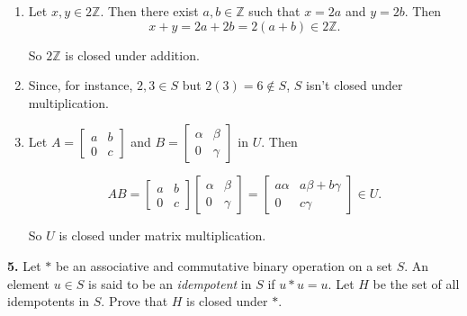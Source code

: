 \documentclass[10pt,]{book}
\theoremstyle{plain}
\theoremstyle{definition}
\theoremstyle{definition}
\theoremstyle{definition}
\theoremstyle{definition}
\numberwithin{equation}{section}
\def\Z{\mathbb{Z}}
\newcommand{\amp}{ & }
\begin{document}
\par\smallskip
\leavevmode%
\begin{enumerate}[label=(\alph*)]
\item\hypertarget{li-71}{}
          Let \(x, y\in 2\Z\). Then there exist \(a,b\in \Z\) such that \(x=2a\) and \(y=2b\).  Then
\begin{equation*}

            x+y=2a+2b=2(a+b)\in 2\Z.
          
\end{equation*}

          So \(2\Z\) is closed under addition.
\item\hypertarget{li-72}{}
          Since, for instance, \(2,3\in S\) but \(2(3)=6\not\in S\), \(S\) isn't closed under multiplication.
\item\hypertarget{li-73}{}
          Let \(A=\begin{bmatrix}a \amp b \\ 0 \amp c\end{bmatrix}\) and \(B=\begin{bmatrix}\alpha \amp \beta \\ 0 \amp \gamma\end{bmatrix}\) in \(U\). 
Then 

\begin{equation*}

            AB=
            \begin{bmatrix}
            a \amp  b \\
            0 \amp  c
            \end{bmatrix} 
            \begin{bmatrix}
            \alpha \amp  \beta \\
            0 \amp  \gamma
            \end{bmatrix} 
            =
            \begin{bmatrix}
            a\alpha \amp  a\beta+b\gamma \\
            0 \amp  c\gamma
            \end{bmatrix} 
          \in U.
          
\end{equation*}

          So \(U\) is closed under matrix multiplication.
\end{enumerate}
\par\smallskip
\noindent\textbf{5.}\quad{}
        Let \(*\) be an associative and commutative binary operation on a set \(S\). An element \(u\in S\) is said to be an \emph{idempotent} in \(S\) if \(u*u=u\). Let \(H\) be the set of all idempotents in \(S\). Prove that \(H\) is closed under \(*\).
\end{document}
